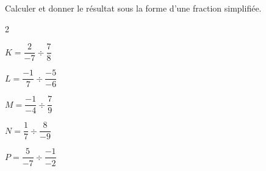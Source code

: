 \begin{exercice*}
    Calculer et donner le résultat sous la forme d'une fraction simplifiée.
    \begin{multicols}2
        \begin{list}{}{}
            \begin{spacing}{2}
                \item $K=\dfrac{2}{-7}\div\dfrac{7}{8}$
                \item $L=\dfrac{-1}{7}\div\dfrac{-5}{-6}$
                \item $M=\dfrac{-1}{-4}\div\dfrac{7}{9}$
                \item $N=\dfrac{1}{7}\div\dfrac{8}{-9}$
                \item $P=\dfrac{5}{-7}\div\dfrac{-1}{-2}$
            \end{spacing}
        \end{list}
    \end{multicols}
\end{exercice*}

